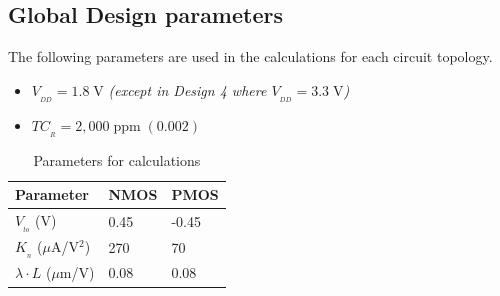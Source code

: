 \documentclass[conference]{IEEEtran}
\begin{document}
\subsection{Global Design parameters}
The following parameters are used in the calculations for each circuit topology.
\begin{itemize}
  \item $V_{_{DD}} = 1.8\;\mathrm{V}$ \emph{(except in Design 4 where $V_{_{DD}} = 3.3\;\mathrm{V}$)}
  \item $TC_{_R} = 2,000\;\mathrm{ppm}\;(0.002)$
\end{itemize}
\begin{table}[!htbp]
  \caption[]{Parameters for calculations}
  \label{tab:parameters}
  \centering
  \begin{tabular}{|l|l|l|}
    \hline
    Parameter                       & NMOS    & PMOS      \\ \hline
    $V_{_{to}}$ (V)                   & 0.45    & -0.45      \\ 
    $K_{_n}$ ($\mu$A/V$^2$)               & 270     & 70         \\ 
    ${\lambda}{\cdot}L$ ($\mu$m/V)  & 0.08    & 0.08       \\ 
    \hline
  \end{tabular}
\end{table}

\end{document}

